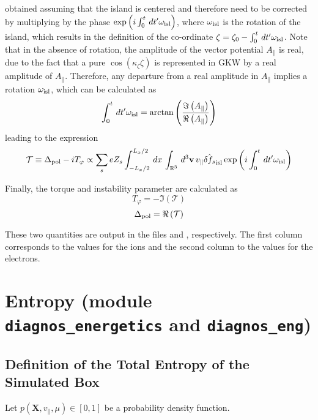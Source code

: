  obtained assuming that the island is centered and therefore need to be corrected by multiplying
 by the phase $\exp\left(i\int_0^t \,dt' \omega_{\rm isl}\right)$, where $\omega_{\rm isl}$ is the rotation of the island, which results
 in the definition of the co-ordinate $\zeta = \zeta_0 - \int_0^t\, dt'\omega_{\rm isl}$. Note that in the absence
 of rotation, the amplitude of the vector potential $A_\parallel$ is real, due to the fact that a pure
 $\cos\left(\kappa_\zeta \zeta\right)$ is represented in GKW by a real amplitude of $A_\parallel$. Therefore,
 any departure from a real amplitude in $A_\parallel$ implies a rotation $\omega_{\rm isl}$, which can be calculated as
\begin{equation}
\int_0^t \, dt' \omega_{\rm isl} = \arctan\left(\frac{\Im\left(A_\parallel\right)}{\Re\left(A_\parallel\right)}\right)
\end{equation}
leading to the expression
\begin{equation}
\mathcal{T}\equiv\Delta_{\rm pol} - i T_\varphi \propto \sum_{s}eZ_s\int_{-L_x/2}^{L_x/2}\, dx\, \int_{\mathbb{R}^3} \, d^3\mathbf{v} \, v_\parallel \hat{\delta f_s}_{\rm isl}\exp\left(i\int_0^t \, dt' \omega_{\rm isl}\right)
\end{equation}

Finally, the torque and instability parameter are calculated as
\begin{equation}
T_\varphi = -\Im\left(\mathcal{T}\right)
\end{equation}
\begin{equation}
\Delta_{\rm pol} = \Re\left(\mathcal{T}\right)
\end{equation}

These two quantities are output in the files  and , respectively. The first column corresponds to
 the values for the ions and the second column to the values for the electrons.

\pagebreak

\section{Entropy (module \texttt{diagnos\_energetics} and \texttt{diagnos\_eng})}


\subsection{Definition of the Total Entropy of the Simulated Box}\label{sec:entr-simul-box}
Let $p(\mathbf{X},v_\parallel, \mu) \in [0,1]$ be a probability density function.

